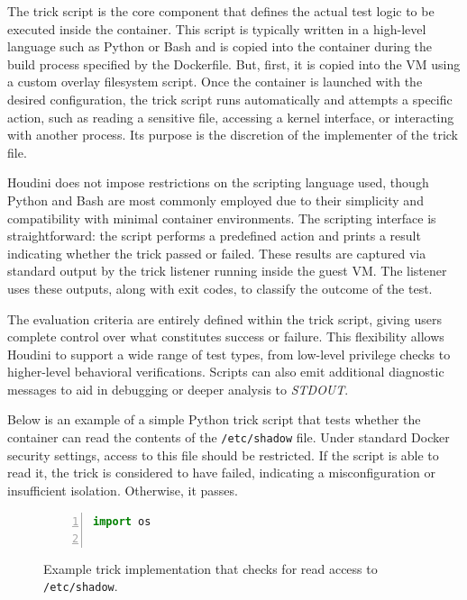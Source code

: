 \begin{doublespace}
The trick script is the core component that defines the actual test logic to be executed inside the container. This script is typically written in a high-level language such as Python or Bash and is copied into the container during the build process specified by the Dockerfile. But, first, it is copied into the VM using a custom overlay filesystem script. Once the container is launched with the desired configuration, the trick script runs automatically and attempts a specific action, such as reading a sensitive file, accessing a kernel interface, or interacting with another process. Its purpose is the discretion of the implementer of the trick file.

Houdini does not impose restrictions on the scripting language used, though Python and Bash are most commonly employed due to their simplicity and compatibility with minimal container environments. The scripting interface is straightforward: the script performs a predefined action and prints a result indicating whether the trick passed or failed. These results are captured via standard output by the trick listener running inside the guest VM. The listener uses these outputs, along with exit codes, to classify the outcome of the test.

The evaluation criteria are entirely defined within the trick script, giving users complete control over what constitutes success or failure. This flexibility allows Houdini to support a wide range of test types, from low-level privilege checks to higher-level behavioral verifications. Scripts can also emit additional diagnostic messages to aid in debugging or deeper analysis to \textit{STDOUT}.

Below is an example of a simple Python trick script that tests whether the container can read the contents of the \texttt{/etc/shadow} file. Under standard Docker security settings, access to this file should be restricted. If the script is able to read it, the trick is considered to have failed, indicating a misconfiguration or insufficient isolation. Otherwise, it passes.

\begin{figure}[H]
\caption{Example trick implementation that checks for read access to \texttt{/etc/shadow}.}
\label{fig:trick-script}
\begin{lstlisting}[language=Python, numbers=left, numberstyle=\tiny, stepnumber=1, breaklines=true, frame=single, backgroundcolor=\color{gray!10}, basicstyle=\ttfamily\scriptsize, showspaces=false, showstringspaces=false]
import os


\end{lstlisting}
\end{figure}
\end{doublespace}
